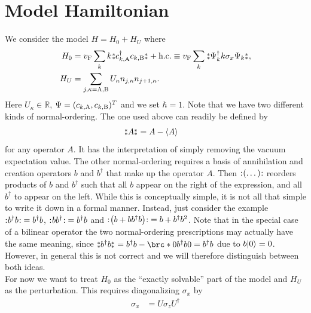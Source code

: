 \documentclass[english, parskip=full]{scrartcl}
\title{\titel}
\author{\autor}
\date{\today}
\begin{document}
\maketitle  %

\section{Model Hamiltonian}
We consider the model $H=H_0 + H_U$ where
\begin{align}
H_0 &= \vf\sum_k k \varnormord{c_{k,\A}^\dagger c_{k,\B}} + \hc \equiv \vf\sum_k \varnormord{\Psi_k^\dagger k\sigma_x \Psi_k},\\
H_U &= \sum_{j,\kappa = \A,\B} U_\kappa n_{j,\kappa} n_{j+1,\kappa}.
\end{align}
Here $U_\kappa\in\mathbb{R}$, $\Psi = (c_{k,\A}, c_{k,\B})^T$ and we set $\hbar=1$.
Note that we have two different kinds of normal-ordering.
The one used above can readily be defined by
\begin{align}
\varnormord{A} &= A - \bra*{A}
\end{align}
for any operator $A$.
It has the interpretation of simply removing the vacuum expectation value.
The other normal-ordering requires a basis of annihilation and creation operators $b$ and $b^\dagger$ that make up the operator $A$.
Then $\normord{(\dots)}$ reorders products of $b$ and $b^\dagger$ such that all $b$ appear on the right of the expression, and all $b^\dagger$ to appear on the left.
While this is conceptually simple, it is not all that simple to write it down in a formal manner.
Instead, just consider the example $\normord{b^\dagger b} = b^\dagger b$, $\normord{bb^\dagger}=b^\dagger b$ and $\normord{\kla*{b + bb^\dagger b}} = b + b^\dagger b^2$.
Note that in the special case of a bilinear operator the two normal-ordering prescriptions may actually have the same meaning, since $\varnormord{b^\dagger b} = b^\dagger b - \brc*{0}{b^\dagger b}{0} = b^\dagger b$ due to $b\Ket{0} = 0$.
However, in general this is not correct and we will therefore distinguish between both ideas.\\
For now we want to treat $H_0$ as the ``exactly solvable'' part of the model and $H_U$ as the perturbation.
This requires diagonalizing $\sigma_x$ by
\begin{align}
\sigma_x &= U \sigma_z U^\dagger
\end{align}
\end{document}
